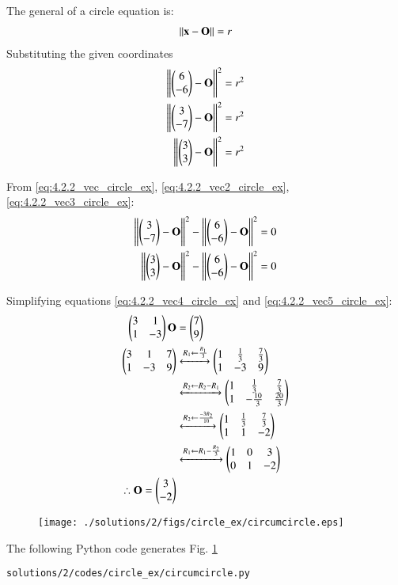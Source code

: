  The general of a circle equation is:
\begin{align}
\left\lVert\mathbf{x}-\mathbf{O}\right\rVert = r
\end{align}
Substituting the given coordinates
\begin{align}
\left\lVert\begin{pmatrix}6\\-6\end{pmatrix}-\mathbf{O}\right\rVert^2 &= r^2 \label{eq:4.2.2_vec_circle_ex} \\
\left\lVert\begin{pmatrix}3\\-7\end{pmatrix}-\mathbf{O}\right\rVert^2 &= r^2 \label{eq:4.2.2_vec2_circle_ex}\\
\left\lVert\begin{pmatrix}3\\3\end{pmatrix}-\mathbf{O}\right\rVert^2 &= r^2 \label{eq:4.2.2_vec3_circle_ex}
\end{align}

From \eqref{eq:4.2.2_vec_circle_ex}, \eqref{eq:4.2.2_vec2_circle_ex}, \eqref{eq:4.2.2_vec3_circle_ex}:
\begin{align}
\left\lVert\begin{pmatrix}3\\-7\end{pmatrix}-\mathbf{O}\right\rVert^2 - \left\lVert\begin{pmatrix}6\\-6\end{pmatrix}-\mathbf{O}\right\rVert^2 &= 0 \label{eq:4.2.2_vec4_circle_ex} \\
\left\lVert\begin{pmatrix}3\\3\end{pmatrix}-\mathbf{O}\right\rVert^2 - \left\lVert\begin{pmatrix}6\\-6\end{pmatrix}-\mathbf{O}\right\rVert^2 &= 0 \label{eq:4.2.2_vec5_circle_ex}
\end{align} 

Simplifying equations \eqref{eq:4.2.2_vec4_circle_ex} and \eqref{eq:4.2.2_vec5_circle_ex}:
\begin{align}
\begin{pmatrix}3 & 1 \\ 1 & -3 \end{pmatrix}\mathbf{O} &= \begin{pmatrix}7\\9\end{pmatrix}\\
\begin{pmatrix}3 & 1 & 7  \\
1 & -3 & 9 
\end{pmatrix}
&\xleftrightarrow[]{R_1 \leftarrow \frac{R_1}{3}}
\begin{pmatrix}1 & \frac{1}{3} & \frac{7}{3} \\
1 & -3 & 9 
\end{pmatrix}\\
&\xleftrightarrow[]{R_2 \leftarrow R_2 - R_1}
\begin{pmatrix}1 & \frac{1}{3} & \frac{7}{3} \\
1 & -\frac{10}{3} & \frac{20}{3} 
\end{pmatrix}\\
&\xleftrightarrow[]{R_2 \leftarrow \frac{-3R_2}{10}}
\begin{pmatrix}1 & \frac{1}{3} & \frac{7}{3} \\
1 & 1 & -2 
\end{pmatrix}\\
&\xleftrightarrow[]{R_1 \leftarrow R_1-\frac{R_2}{3}}
\begin{pmatrix}1 & 0 & 3 \\
0 & 1 & -2 
\end{pmatrix}\\
\therefore \mathbf{O} = \begin{pmatrix}3\\-2\end{pmatrix}
\end{align}

 \begin{figure}[!ht]
\centering
\texttt{[image: ./solutions/2/figs/circle\_ex/circumcircle.eps]}
\caption{}
\label{fig:4.2.2_Circumcircle2_circle_ex}
\end{figure} 

The following Python code generates Fig. \ref{fig:4.2.2_Circumcircle2_circle_ex}

\begin{lstlisting}
solutions/2/codes/circle_ex/circumcircle.py
\end{lstlisting}



